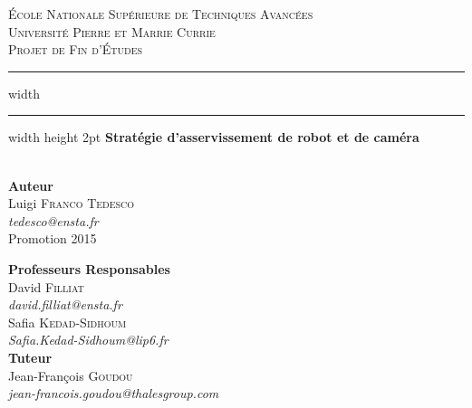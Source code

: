 \begin{titlepage}

	\begin{center}
	
	
		\textsc{\large École Nationale Supérieure de Techniques Avancées}\\[1.5cm]

		\textsc{\large Université Pierre et Marrie Currie}\\[1cm]
	
		\textsc{\Large Projet de Fin d'Études}\\[0.5cm]
	
	        \hrule width \hsize \kern 1mm \hrule width \hsize height 2pt
                \vfill
		{ \huge \bfseries Stratégie d'asservissement de robot et de caméra}\\[0.15cm]
	
		      \HRule \\[1.5cm]
	                
		\begin{minipage}{0.4\textwidth}
			\begin{flushleft} \large
				\textbf{Auteur}\\
				Luigi \textsc{Franco Tedesco}\\
				      \textit{tedesco@ensta.fr}\\
				Promotion 2015
			\end{flushleft}
		\end{minipage}
		\begin{minipage}{0.55\textwidth}
			\begin{flushright} \large
				\textbf{Professeurs Responsables} \\
				David \textsc{Filliat} \\
				\textit{david.filliat@ensta.fr}\\[0.1cm]
				Safia \textsc{Kedad-Sidhoum} \\
				\textit{Safia.Kedad-Sidhoum@lip6.fr}\\[0.1cm]
				\textbf{Tuteur} \\
				Jean-François \textsc{Goudou} \\
				\textit{jean-francois.goudou@thalesgroup.com}\\
			\end{flushright}
		\end{minipage}


\end{center}
\end{titlepage}
